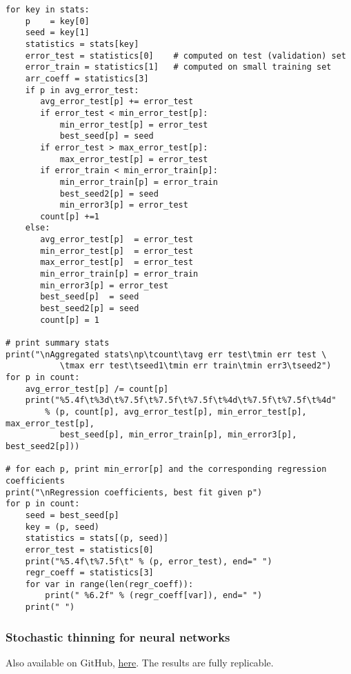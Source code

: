 \documentclass[oneside,10pt]{book}
\begin{document}
\begin{lstlisting}
for key in stats:
    p    = key[0]
    seed = key[1]
    statistics = stats[key]
    error_test = statistics[0]    # computed on test (validation) set
    error_train = statistics[1]   # computed on small training set
    arr_coeff = statistics[3]
    if p in avg_error_test:
       avg_error_test[p] += error_test
       if error_test < min_error_test[p]:
           min_error_test[p] = error_test
           best_seed[p] = seed
       if error_test > max_error_test[p]:
           max_error_test[p] = error_test
       if error_train < min_error_train[p]:
           min_error_train[p] = error_train
           best_seed2[p] = seed
           min_error3[p] = error_test
       count[p] +=1
    else:
       avg_error_test[p]  = error_test
       min_error_test[p]  = error_test
       max_error_test[p]  = error_test
       min_error_train[p] = error_train
       min_error3[p] = error_test
       best_seed[p]  = seed
       best_seed2[p] = seed
       count[p] = 1

# print summary stats
print("\nAggregated stats\np\tcount\tavg err test\tmin err test \
           \tmax err test\tseed1\tmin err train\tmin err3\tseed2")
for p in count:
    avg_error_test[p] /= count[p]
    print("%5.4f\t%3d\t%7.5f\t%7.5f\t%7.5f\t%4d\t%7.5f\t%7.5f\t%4d"
        % (p, count[p], avg_error_test[p], min_error_test[p], max_error_test[p],
           best_seed[p], min_error_train[p], min_error3[p], best_seed2[p]))

# for each p, print min_error[p] and the corresponding regression coefficients
print("\nRegression coefficients, best fit given p")
for p in count:
    seed = best_seed[p]
    key = (p, seed)
    statistics = stats[(p, seed)]
    error_test = statistics[0]
    print("%5.4f\t%7.5f\t" % (p, error_test), end=" ")
    regr_coeff = statistics[3]
    for var in range(len(regr_coeff)):
        print(" %6.2f" % (regr_coeff[var]), end=" ")
    print(" ")
\end{lstlisting}

\subsubsection{Stochastic thinning for neural networks}\label{crottalbourrique}

Also available on GitHub, \href{https://github.com/VincentGranville/Statistical-Optimization/blob/main/thinned_neuralNets.py}{here}.
The results are fully replicable.\vspace{1ex}
\end{document}
